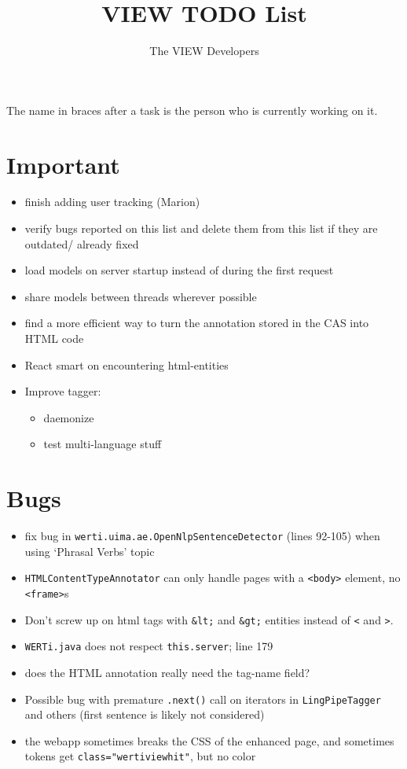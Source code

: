 \documentclass{article}
\begin{document}
\title{VIEW TODO List}
\author{The VIEW Developers}
\maketitle



The name in braces after a task is the person who is currently working on it.

\section{Important}

\begin{itemize}
\item finish adding user tracking (Marion) 
\item verify bugs reported on this list and delete them from this list if they are outdated/ already fixed
\item load models on server startup instead of during the first request
\item share models between threads wherever possible
\item find a more efficient way to turn the annotation stored in the CAS into HTML code
\item React smart on encountering html-entities
\item Improve tagger:
	\begin{itemize}
	\item daemonize
	\item test multi-language stuff
	\end{itemize}
\end{itemize}

\section{Bugs}

\begin{itemize}
\item fix bug in \verb+werti.uima.ae.OpenNlpSentenceDetector+ (lines 92-105) when using `Phrasal Verbs' topic
\item \verb+HTMLContentTypeAnnotator+ can only handle pages with a \verb+<body>+ element, no \verb+<frame>+s
\item Don't screw up on html tags with \verb+&lt;+ and \verb+&gt;+ entities instead of \verb+<+ and \verb+>+.
\item \verb+WERTi.java+ does not respect \verb+this.server+; line 179
\item does the HTML annotation really need the tag-name field?
\item Possible bug with premature \verb+.next()+ call on iterators in \verb+LingPipeTagger+ and others (first sentence is likely not considered)
\item the webapp sometimes breaks the CSS of the enhanced page, and sometimes tokens get \verb_class="wertiviewhit"_, but no color
\end{itemize}
\end{document}
